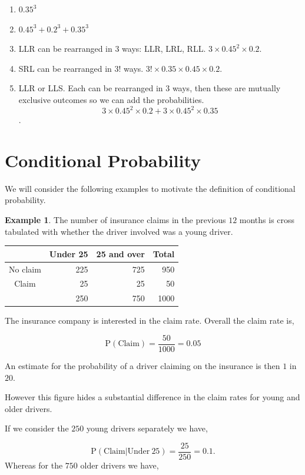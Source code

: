 \documentclass[
]{book}
\theoremstyle{definition}
\theoremstyle{definition}
\newtheorem{example}{Example}[chapter]
\theoremstyle{definition}
\theoremstyle{definition}
\theoremstyle{remark}
\begin{document}
\begin{enumerate}
\def\labelenumi{\alph{enumi})}
\item
  \(0.35^3\)
\item
  \(0.45^3+0.2^3+0.35^3\)
\item
  LLR can be rearranged in \(3\) ways: LLR, LRL, RLL. \(3\times 0.45^2 \times 0.2\).
\item
  SRL can be rearranged in \(3!\) ways. \(3!\times 0.35 \times 0.45 \times 0.2\).
\item
  LLR or LLS. Each can be rearranged in \(3\) ways, then these are mutually exclusive outcomes so we can add the probabilities. \[3\times 0.45^2 \times 0.2 + 3\times 0.45^2 \times 0.35\].
\end{enumerate}

\hypertarget{conditional-probability}{%
\section{Conditional Probability}\label{conditional-probability}}

We will consider the following examples to motivate the definition of conditional probability.

\begin{example}

The number of insurance claims in the previous \(12\) months is cross tabulated with whether the driver involved was a young driver.

\begin{longtable}[]{@{}crrr@{}}
\toprule
& Under 25 & 25 and over & Total\tabularnewline
\midrule
\endhead
No claim & 225 & 725 & 950\tabularnewline
Claim & 25 & 25 & 50\tabularnewline
& 250 & 750 & 1000\tabularnewline
\bottomrule
\end{longtable}

\end{example}

The insurance company is interested in the claim rate. Overall the claim rate is,

\[\text{P}(\text{Claim})=\frac{50}{1000} = 0.05\]

An estimate for the probability of a driver claiming on the insurance is then \(1\) in \(20\).

However this figure hides a substantial difference in the claim rates for young and older drivers.

If we consider the \(250\) young drivers separately we have,

\[\text{P}(\text{Claim}|\text{Under}\ 25)=\frac{25}{250} = 0.1.\]
Whereas for the \(750\) older drivers we have,
\end{document}
